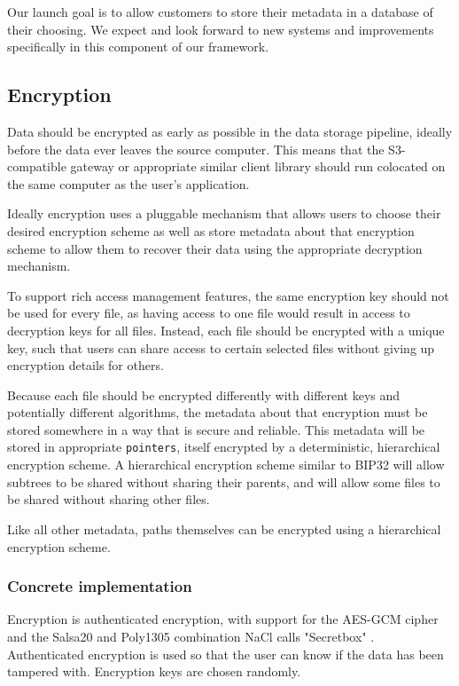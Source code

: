 \documentclass[a4paper,10pt]{article} \usepackage[utf8]{inputenc}
\newcommand{\x}[1]{{\tt #1}} \newcommand{\code}[1]{{\tt #1}}
\begin{document}
Our launch goal is to allow customers to store their metadata in a database of
their choosing. We expect and look forward to new systems and improvements
specifically in this component of our framework.

\subsection{Encryption}

Data should be encrypted as early as possible in the data storage pipeline,
ideally before the data ever leaves the source computer. This means that the
S3-compatible gateway or appropriate similar client library should run
colocated on the same computer as the user's application.

Ideally encryption uses a pluggable mechanism that allows users to choose their
desired encryption scheme as well as store metadata about that encryption
scheme to allow them to recover their data using the appropriate decryption
mechanism.

To support rich access management features, the same encryption key should not
be used for every file, as having access to one file would result in access
to decryption keys for all files. Instead, each file should be encrypted with
a unique key, such that users can share access to certain selected files
without giving up encryption details for others.

Because each file should be encrypted differently with different keys and
potentially different algorithms, the metadata about that encryption must
be stored somewhere in a way that is secure and reliable. This metadata will
be stored in appropriate \x{pointers}, itself encrypted by a deterministic,
hierarchical encryption scheme. A hierarchical encryption scheme similar to
BIP32 \cite{bip32} will allow subtrees to be shared without sharing their
parents, and will allow some files to be shared without sharing other files.

Like all other metadata, paths themselves can be encrypted using a hierarchical
encryption scheme.

\subsubsection{Concrete implementation}

Encryption is authenticated encryption, with support for the AES-GCM cipher
and the Salsa20 and Poly1305 combination NaCl calls "Secretbox"
\cite{nacl-crypto}. Authenticated encryption is used so that the user can know
if the data has been tampered with. Encryption keys are chosen randomly.
\end{document}
